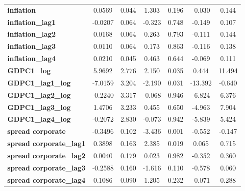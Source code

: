 \begin{center}
\begin{tabular}{lcccccc}
\textbf{inflation}              &       0.0569  &        0.044     &     1.303  &         0.196        &       -0.030    &        0.144     \\
\textbf{inflation\_lag1}        &      -0.0207  &        0.064     &    -0.323  &         0.748        &       -0.149    &        0.107     \\
\textbf{inflation\_lag2}        &       0.0168  &        0.064     &     0.263  &         0.793        &       -0.111    &        0.144     \\
\textbf{inflation\_lag3}        &       0.0110  &        0.064     &     0.173  &         0.863        &       -0.116    &        0.138     \\
\textbf{inflation\_lag4}        &       0.0210  &        0.045     &     0.463  &         0.644        &       -0.069    &        0.111     \\
\textbf{GDPC1\_log}             &       5.9692  &        2.776     &     2.150  &         0.035        &        0.444    &       11.494     \\
\textbf{GDPC1\_lag1\_log}       &      -7.0159  &        3.204     &    -2.190  &         0.031        &      -13.392    &       -0.640     \\
\textbf{GDPC1\_lag2\_log}       &      -0.2240  &        3.317     &    -0.068  &         0.946        &       -6.824    &        6.376     \\
\textbf{GDPC1\_lag3\_log}       &       1.4706  &        3.233     &     0.455  &         0.650        &       -4.963    &        7.904     \\
\textbf{GDPC1\_lag4\_log}       &      -0.2072  &        2.830     &    -0.073  &         0.942        &       -5.839    &        5.424     \\
\textbf{spread corporate}       &      -0.3496  &        0.102     &    -3.436  &         0.001        &       -0.552    &       -0.147     \\
\textbf{spread corporate\_lag1} &       0.3898  &        0.163     &     2.385  &         0.019        &        0.065    &        0.715     \\
\textbf{spread corporate\_lag2} &       0.0040  &        0.179     &     0.023  &         0.982        &       -0.352    &        0.360     \\
\textbf{spread corporate\_lag3} &      -0.2588  &        0.160     &    -1.616  &         0.110        &       -0.578    &        0.060     \\
\textbf{spread corporate\_lag4} &       0.1086  &        0.090     &     1.205  &         0.232        &       -0.071    &        0.288     \\

\end{tabular}
\end{center}
